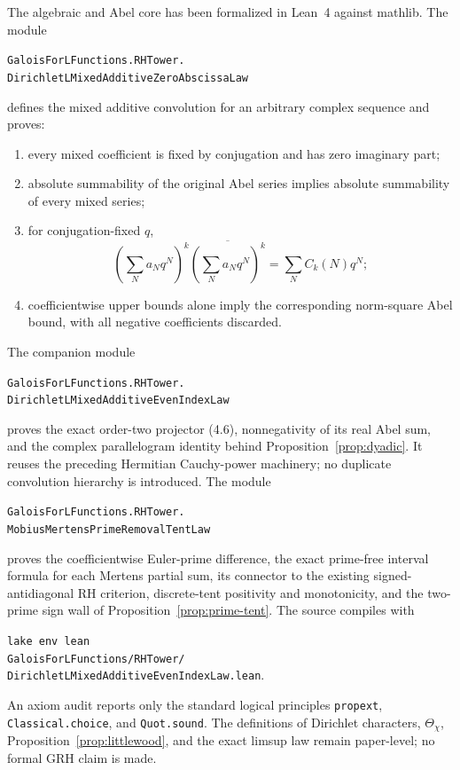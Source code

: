 \documentclass[11pt]{article}
\theoremstyle{remark}
\newcommand{\GRH}{\mathrm{GRH}}
\begin{document}
The algebraic and Abel core has been formalized in Lean~4 against mathlib.  The module
\begin{center}
\small
\texttt{GaloisForLFunctions.RHTower.}\\
\texttt{DirichletLMixedAdditiveZeroAbscissaLaw}
\end{center}
defines the mixed additive convolution for an arbitrary complex sequence and proves:
\begin{enumerate}
\item every mixed coefficient is fixed by conjugation and has zero imaginary part;
\item absolute summability of the original Abel series implies absolute summability of every
mixed series;
\item for conjugation-fixed $q$,
\[
 \left(\sum_Na_Nq^N\right)^k
 \overline{\left(\sum_Na_Nq^N\right)^k}
 =\sum_N C_k(N)q^N;
\]
\item coefficientwise upper bounds alone imply the corresponding norm-square Abel bound, with
all negative coefficients discarded.
\end{enumerate}
The companion module
\begin{center}
\small
\texttt{GaloisForLFunctions.RHTower.}\\
\texttt{DirichletLMixedAdditiveEvenIndexLaw}
\end{center}
proves the exact order-two projector (4.6), nonnegativity of its real Abel sum, and the complex
parallelogram identity behind Proposition~\ref{prop:dyadic}.  It reuses the preceding Hermitian
Cauchy-power machinery; no duplicate convolution hierarchy is introduced.
The module
\begin{center}
\small
\texttt{GaloisForLFunctions.RHTower.}\\
\texttt{MobiusMertensPrimeRemovalTentLaw}
\end{center}
proves the coefficientwise Euler-prime difference, the exact prime-free interval formula for each
Mertens partial sum, its connector to the existing signed-antidiagonal RH criterion, discrete-tent
positivity and monotonicity, and the two-prime sign wall of
Proposition~\ref{prop:prime-tent}.
The source compiles with
\begin{center}
\small
\texttt{lake env lean}\\
\texttt{GaloisForLFunctions/RHTower/}\\
\texttt{DirichletLMixedAdditiveEvenIndexLaw.lean}.
\end{center}
An axiom audit reports only the standard logical principles
\texttt{propext}, \texttt{Classical.choice}, and \texttt{Quot.sound}.  The definitions of
Dirichlet characters, $\Theta_\chi$, Proposition~\ref{prop:littlewood}, and the exact limsup law
remain paper-level; no formal $\GRH$ claim is made.
\end{document}
